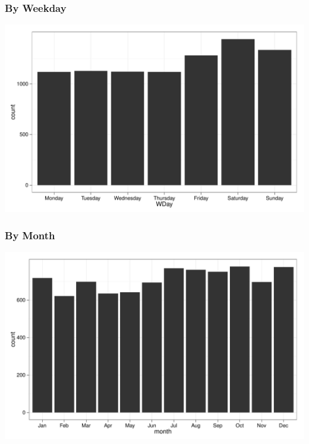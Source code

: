 \documentclass[]{beamer}
\newenvironment{knitrout}{}{} %
\renewenvironment{knitrout}{\begin{footnotesize}}{\end{footnotesize}}
\begin{document}
\begin{frame}[fragile]
\frametitle{By Weekday}



\begin{knitrout}
\color{fgcolor}\includegraphics[width=\linewidth]{figures/murder-unnamed-chunk-3} 
\end{knitrout}


\end{frame}

\begin{frame}[fragile]
\frametitle{By Month}



\begin{knitrout}
\color{fgcolor}\includegraphics[width=\linewidth]{figures/murder-unnamed-chunk-4} 
\end{knitrout}

\end{frame}
\end{document}
